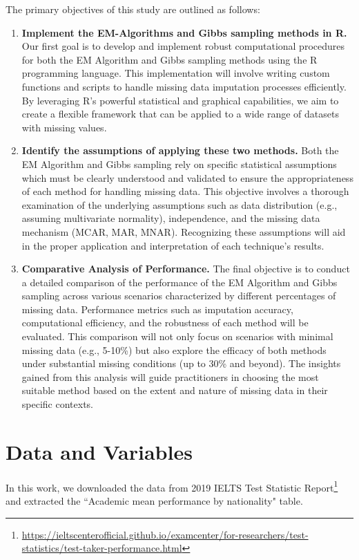 \documentclass[12pt]{article}
\begin{document}
The primary objectives of this study are outlined as follows:

\begin{enumerate}
	\item \textbf{Implement the EM-Algorithms and Gibbs sampling methods in R.}
Our first goal is to develop and implement robust computational procedures for both the EM Algorithm and Gibbs sampling methods using the R programming language. This implementation will involve writing custom functions and scripts to handle missing data imputation processes efficiently. By leveraging R’s powerful statistical and graphical capabilities, we aim to create a flexible framework that can be applied to a wide range of datasets with missing values.
	\item \textbf{ Identify the assumptions of applying these two methods.}
Both the EM Algorithm and Gibbs sampling rely on specific statistical assumptions which must be clearly understood and validated to ensure the appropriateness of each method for handling missing data. This objective involves a thorough examination of the underlying assumptions such as data distribution (e.g., assuming multivariate normality), independence, and the missing data mechanism (MCAR, MAR, MNAR). Recognizing these assumptions will aid in the proper application and interpretation of each technique's results.
\item \textbf{Comparative Analysis of Performance.}
The final objective is to conduct a detailed comparison of the performance of the EM Algorithm and Gibbs sampling across various scenarios characterized by different percentages of missing data. Performance metrics such as imputation accuracy, computational efficiency, and the robustness of each method will be evaluated. This comparison will not only focus on scenarios with minimal missing data (e.g., 5-10\%) but also explore the efficacy of both methods under substantial missing conditions (up to 30\% and beyond). The insights gained from this analysis will guide practitioners in choosing the most suitable method based on the extent and nature of missing data in their specific contexts.
\end{enumerate}


\section{Data and Variables}

In this work, we downloaded the data from 2019 IELTS Test Statistic Report\footnote{\url{https://ieltscenterofficial.github.io/examcenter/for-researchers/test-statistics/test-taker-performance.html}} and extracted the ``Academic mean performance by nationality" table.
\end{document}
